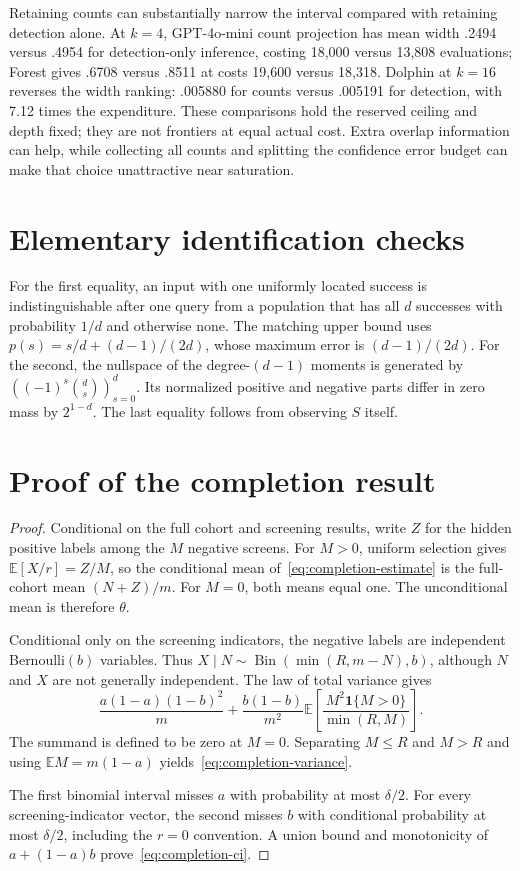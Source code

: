 \documentclass[conference]{IEEEtran}
\newcommand{\E}{\mathbb{E}}
\newcommand{\ind}{\mathbf{1}}
\DeclareMathOperator{\Bin}{Bin}
\begin{document}
Retaining counts can substantially narrow the interval compared with retaining detection alone. At $k=4$, GPT-4o-mini count projection has mean width .2494 versus .4954 for detection-only inference, costing 18,000 versus 13,808 evaluations; Forest gives .6708 versus .8511 at costs 19,600 versus 18,318. Dolphin at $k=16$ reverses the width ranking: .005880 for counts versus .005191 for detection, with 7.12 times the expenditure. These comparisons hold the reserved ceiling and depth fixed; they are not frontiers at equal actual cost. Extra overlap information can help, while collecting all counts and splitting the confidence error budget can make that choice unattractive near saturation.

\section{Elementary identification checks}\label{app:checks}
For the first equality, an input with one uniformly located success is indistinguishable after one query from a population that has all $d$ successes with probability $1/d$ and otherwise none. The matching upper bound uses $p(s)=s/d+(d-1)/(2d)$, whose maximum error is $(d-1)/(2d)$. For the second, the nullspace of the degree-$(d-1)$ moments is generated by $((-1)^s\binom ds)_{s=0}^d$. Its normalized positive and negative parts differ in zero mass by $2^{1-d}$. The last equality follows from observing $S$ itself.

\section{Proof of the completion result}\label{app:completion-proof}
\begin{proof}
Conditional on the full cohort and screening results, write $Z$ for the hidden positive labels among the $M$ negative screens. For $M>0$, uniform selection gives $\E[X/r]=Z/M$, so the conditional mean of~\eqref{eq:completion-estimate} is the full-cohort mean $(N+Z)/m$. For $M=0$, both means equal one. The unconditional mean is therefore $\theta$.

Conditional only on the screening indicators, the negative labels are independent Bernoulli$(b)$ variables. Thus $X\mid N\sim\Bin(\min(R,m-N),b)$, although $N$ and $X$ are not generally independent. The law of total variance gives
\[
 \frac{a(1-a)(1-b)^2}{m}
 +\frac{b(1-b)}{m^2}\E\!\left[\frac{M^2\ind\{M>0\}}{\min(R,M)}\right].
\]
The summand is defined to be zero at $M=0$. Separating $M\leq R$ and $M>R$ and using $\E M=m(1-a)$ yields~\eqref{eq:completion-variance}.

The first binomial interval misses $a$ with probability at most $\delta/2$. For every screening-indicator vector, the second misses $b$ with conditional probability at most $\delta/2$, including the $r=0$ convention. A union bound and monotonicity of $a+(1-a)b$ prove~\eqref{eq:completion-ci}.
\end{proof}
\end{document}
